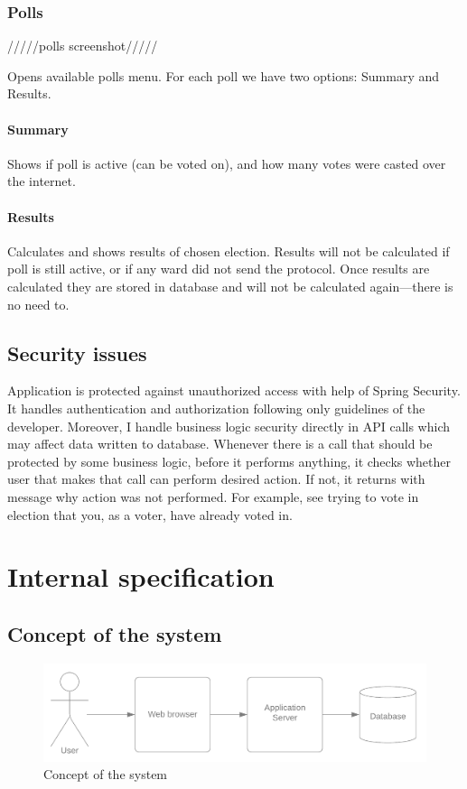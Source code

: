 \documentclass[a4paper,twoside,12pt]{book}
\begin{document}
    \subsection{Polls}

      /////polls screenshot/////

      Opens available polls menu. For each poll we have two options: Summary and Results.

      \subsubsection{Summary}
        Shows if poll is active (can be voted on), and how many votes were casted over the internet.

      \subsubsection{Results}
        Calculates and shows results of chosen election. Results will not be calculated if poll is still active, or if any ward did not send the protocol.
        Once results are calculated they are stored in database and will not be calculated again---there is no need to.

  \section{Security issues}
    Application is protected against unauthorized access with help of Spring Security. It handles authentication and authorization following only guidelines of the developer.
    Moreover, I handle business logic security directly in API calls which may affect data written to database. 
    Whenever there is a call that should be protected by some business logic, before it performs anything, 
    it checks whether user that makes that call can perform desired action. If not, it returns with message why action was not performed. 
    For example, see trying to vote in election that you, as a voter, have already voted in.

\chapter{Internal specification}
  \section{Concept of the system}
    \begin{figure}[h]
      \includegraphics[width=\linewidth]{system_concept.png}
      \caption{Concept of the system}
      \label{fig:system_concept}
    \end{figure}
\end{document}
